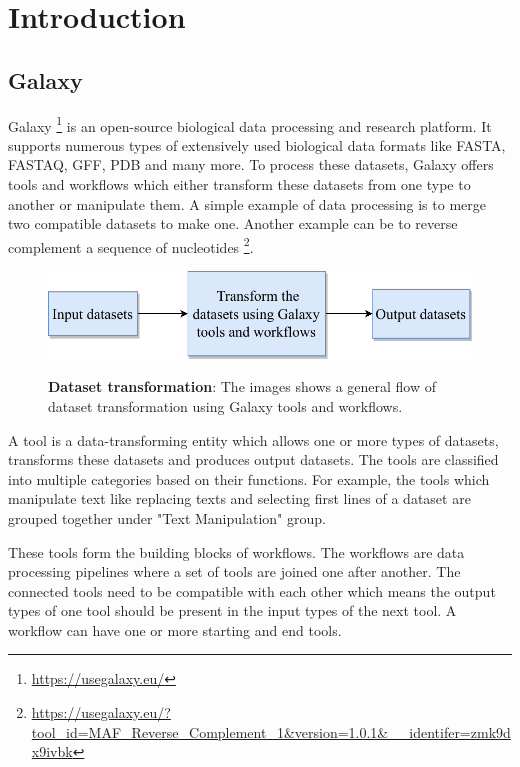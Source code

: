 \chapter{Introduction}\label{chap:introduction}
\section{Galaxy}
Galaxy {\footnote{\url{https://usegalaxy.eu/}}} is an open-source biological data processing and research platform. It supports numerous types of extensively used biological data formats like FASTA, FASTAQ, GFF, PDB and many more. To process these datasets, Galaxy offers tools and workflows which either transform these datasets from one type to another or manipulate them. A simple example of data processing is to merge two compatible datasets to make one. Another example can be to reverse complement a sequence of nucleotides \footnote{\url{https://usegalaxy.eu/?tool_id=MAF_Reverse_Complement_1&version=1.0.1&__identifer=zmk9dx9ivbk}}.

\begin{figure}[h]
\begin{centering}
    {\includegraphics[scale=0.8]{figures/image_Galaxy_1.pdf}}
    \caption[Basic flow of dataset transformation]{\textbf{Dataset transformation}: The images shows a general flow of dataset transformation using Galaxy tools and workflows.}
\end{centering}
\end{figure}

A tool is a data-transforming entity which allows one or more types of datasets, transforms these datasets and produces output datasets. The tools are classified into multiple categories based on their functions. For example, the tools which manipulate text like replacing texts and selecting first lines of a dataset are grouped together under "Text Manipulation" group.

These tools form the building blocks of workflows. The workflows are data processing pipelines where a set of tools are joined one after another. The connected tools need to be compatible with each other which means the output types of one tool should be present in the input types of the next tool. A workflow can have one or more starting and end tools.

